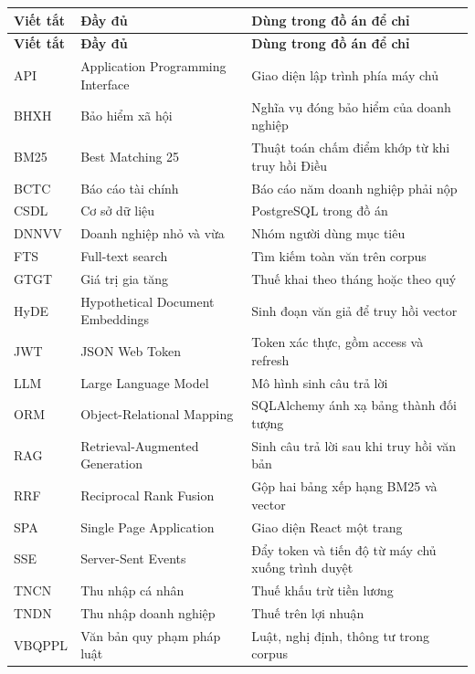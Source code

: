 \begin{longtable}{p{2.6cm}p{5.8cm}p{5.8cm}}
\toprule
\textbf{Viết tắt} & \textbf{Đầy đủ} & \textbf{Dùng trong đồ án để chỉ} \\
\midrule
\endfirsthead
\toprule
\textbf{Viết tắt} & \textbf{Đầy đủ} & \textbf{Dùng trong đồ án để chỉ} \\
\midrule
\endhead
API & Application Programming Interface & Giao diện lập trình phía máy chủ \\
BHXH & Bảo hiểm xã hội & Nghĩa vụ đóng bảo hiểm của doanh nghiệp \\
BM25 & Best Matching 25 & Thuật toán chấm điểm khớp từ khi truy hồi Điều \\
BCTC & Báo cáo tài chính & Báo cáo năm doanh nghiệp phải nộp \\
CSDL & Cơ sở dữ liệu & PostgreSQL trong đồ án \\
DNNVV & Doanh nghiệp nhỏ và vừa & Nhóm người dùng mục tiêu \\
FTS & Full-text search & Tìm kiếm toàn văn trên corpus \\
GTGT & Giá trị gia tăng & Thuế khai theo tháng hoặc theo quý \\
HyDE & Hypothetical Document Embeddings & Sinh đoạn văn giả để truy hồi vector \\
JWT & JSON Web Token & Token xác thực, gồm access và refresh \\
LLM & Large Language Model & Mô hình sinh câu trả lời \\
ORM & Object-Relational Mapping & SQLAlchemy ánh xạ bảng thành đối tượng \\
RAG & Retrieval-Augmented Generation & Sinh câu trả lời sau khi truy hồi văn bản \\
RRF & Reciprocal Rank Fusion & Gộp hai bảng xếp hạng BM25 và vector \\
SPA & Single Page Application & Giao diện React một trang \\
SSE & Server-Sent Events & Đẩy token và tiến độ từ máy chủ xuống trình duyệt \\
TNCN & Thu nhập cá nhân & Thuế khấu trừ tiền lương \\
TNDN & Thu nhập doanh nghiệp & Thuế trên lợi nhuận \\
VBQPPL & Văn bản quy phạm pháp luật & Luật, nghị định, thông tư trong corpus \\
\bottomrule
\end{longtable}

\clearpage

{}
\listoffigures
\clearpage

{}
\listoftables
\clearpage
